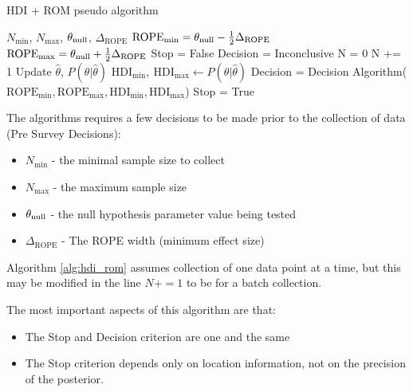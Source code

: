 \begin{algorithm}
    \caption{HDI + ROM pseudo algorithm}\label{alg:hdi_rom}
    \begin{algorithmic}
    \Require $N_\mathrm{min}$, $N_\mathrm{max}$, $\theta_{\rm null}$, $\Delta_\mathrm{ROPE}$
    \State $\mathrm{ROPE}_\mathrm{min} = \theta_{\rm null} - \frac{1}{2}\Delta_\mathrm{ROPE}$
    \State $\mathrm{ROPE}_\mathrm{max} = \theta_{\rm null} + \frac{1}{2}\Delta_\mathrm{ROPE}$
    \State Stop = False
    \State Decision = Inconclusive
    \State N = 0
    \State N += 1  
    \State Update $\hat\theta$, $P(\theta|\hat\theta)$  
    \State $\mathrm{HDI}_\mathrm{min}, \ \mathrm{HDI}_\mathrm{max}  \gets P(\theta|\hat\theta)$
        \State Decision = Decision Algorithm($\mathrm{ROPE}_\mathrm{min}, \mathrm{ROPE}_\mathrm{max}, \mathrm{HDI}_\mathrm{min}, \mathrm{HDI}_\mathrm{max}$)
            \State \HiLi Stop = True  
        \EndIf
    \EndIf
    \EndWhile
    \end{algorithmic}
\end{algorithm}


The algorithms requires a few decisions to be made prior to the collection of data (Pre Survey Decisions):

\begin{itemize}
    \item $N_\mathrm{min}$ - the minimal sample size to collect
    \item $N_\mathrm{max}$ - the maximum sample size
    \item $\theta_{\rm null}$ - the null hypothesis parameter value being tested
    \item $\Delta_\mathrm{ROPE}$ - The ROPE width (minimum effect size)
\end{itemize}

Algorithm \ref{alg:hdi_rom} assumes collection of one data point at a time,
but this may be modified in the line $N += 1$ to be for a batch collection.

The most important aspects of this algorithm are that:

\begin{itemize}
    \item The Stop and Decision criterion are one and the same
    \item The Stop criterion depends only on location information, not on the precision of the posterior.
\end{itemize}

